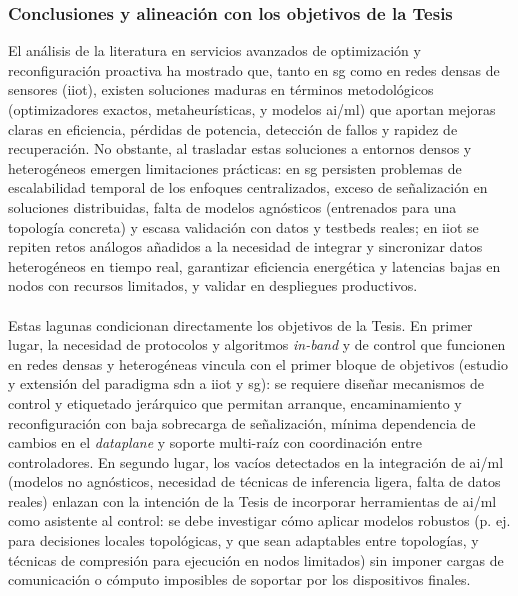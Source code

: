 \subsubsection{Conclusiones y alineación con los objetivos de la Tesis}
\label{subsubsec:conclu_opt}
El análisis de la literatura en servicios avanzados de optimización y reconfiguración proactiva ha mostrado que, tanto en \gls{sg} como en redes densas de sensores (\gls{iiot}), existen soluciones maduras en términos metodológicos (optimizadores exactos, metaheurísticas, y modelos \gls{ai}/\gls{ml}) que aportan mejoras claras en eficiencia, pérdidas de potencia, detección de fallos y rapidez de recuperación. No obstante, al trasladar estas soluciones a entornos densos y heterogéneos emergen limitaciones prácticas: en \gls{sg} persisten problemas de escalabilidad temporal de los enfoques centralizados, exceso de señalización en soluciones distribuidas, falta de modelos agnósticos (entrenados para una topología concreta) y escasa validación con datos y testbeds reales; en \gls{iiot} se repiten retos análogos añadidos a la necesidad de integrar y sincronizar datos heterogéneos en tiempo real, garantizar eficiencia energética y latencias bajas en nodos con recursos limitados, y validar en despliegues productivos.\\
\\
Estas lagunas condicionan directamente los objetivos de la Tesis. En primer lugar, la necesidad de protocolos y algoritmos \emph{in-band} y de control que funcionen en redes densas y heterogéneas vincula con el primer bloque de objetivos (estudio y extensión del paradigma \gls{sdn} a \gls{iiot} y \gls{sg}): se requiere diseñar mecanismos de control y etiquetado jerárquico que permitan arranque, encaminamiento y reconfiguración con baja sobrecarga de señalización, mínima dependencia de cambios en el \textit{dataplane} y soporte multi-raíz con coordinación entre controladores. En segundo lugar, los vacíos detectados en la integración de \gls{ai}/\gls{ml} (modelos no agnósticos, necesidad de técnicas de inferencia ligera, falta de datos reales) enlazan con la intención de la Tesis de incorporar herramientas de \gls{ai}/\gls{ml} como asistente al control: se debe investigar cómo aplicar modelos robustos (p. ej. para decisiones locales topológicas, y que sean adaptables entre topologías, y técnicas de compresión para ejecución en nodos limitados) sin imponer cargas de comunicación o cómputo imposibles de soportar por los dispositivos finales.\\
\\
